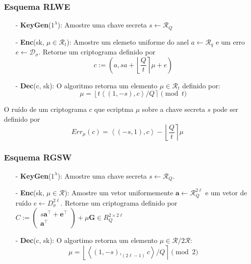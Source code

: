 \subsubsection{Esquema RLWE}

\begin{itemize}[itemsep=0pt, parsep=0pt]
    \item[-] \textbf{KeyGen}($1^{\lambda}$): Amostre uma chave secreta $s \leftarrow \mathcal{R}_Q$
    \item[-] \textbf{Enc}(sk, $\mu \in \mathcal{R}_t$): Amostre um elemeto uniforme do anel $a \leftarrow \mathcal{R}_q$ e
um erro $e \leftarrow \mathcal{D_{\sigma}}$. Retorne um criptograma definido por 
    $$
    c := (a, sa + \left\lfloor \frac{Q}{t} \right\rceil \mu + e)
    $$
    \item[-] \textbf{Dec}(c, sk): O algoritmo retorna um elemento $\mu \in \mathcal{R}_t$ definido por:
    $$
        \mu = \left\lfloor t \left\langle (1,-s),c \right\rangle/Q \right\rceil  \pmod{t}  
    $$
\end{itemize}

O ruído de um criptograma $c$ que ecriptma $\mu$ sobre a chave secreta $s$ pode ser definido por 
$$Err_\mu(c) = \left\langle (-s,1), c \right\rangle- \left\lfloor \frac{Q}{t} \right\rceil \mu$$

\subsubsection{Esquema RGSW}

\begin{itemize}[itemsep=0pt, parsep=0pt]
    \item[-] \textbf{KeyGen}($1^{\lambda}$): Amostre uma chave secreta $s \leftarrow \mathcal{R}_Q$.
    \item[-] \textbf{Enc}(sk, $\mu \in \mathcal{R}$): Amostre um vetor uniformemente $\mathbf{a} \leftarrow \mathcal{R}_Q^{2\ell}$ e um vetor de ruído $e \leftarrow D_{\sigma}^{2\ell}$. Retorne um 
    criptograma definido por $C := \begin{pmatrix} s \mathbf{a}^\top + \mathbf{e}^\top \\ \mathbf{a}^\top \end{pmatrix} + \mu \mathbf{G} \in R_Q^{2 \times 2\ell}$
    \item[-] \textbf{Dec}(c, sk): O algortimo retorna um elemento $\mu \in \mathcal{R}/2\mathcal{R}$:
    $$ 
    \mu = \left\lfloor \left\langle (1,-s),_{(2\ell -1)}c \right\rangle/Q \right\rceil  \pmod{2}  
    $$
    
\end{itemize}

